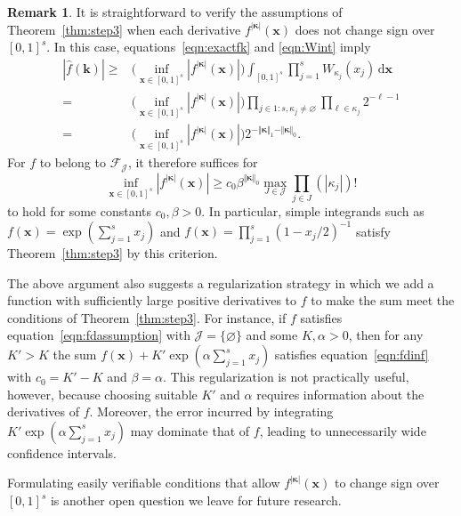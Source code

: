 \documentclass{article}
\theoremstyle{definition}
\newtheorem{remark}{Remark}
\renewcommand{\geq}{\geqslant}
\renewcommand{\emptyset}{\varnothing}
\newcommand{\cj}{\mathcal{J}}
\newcommand{\bsk}{\boldsymbol{k}}
\newcommand{\bsx}{\boldsymbol{x}}
\newcommand{\bskappa}{\boldsymbol{\kappa}}
\newcommand{\rd}{\,\mathrm{d}}
\begin{document}
\begin{remark}
    It is straightforward to verify the assumptions of Theorem~\ref{thm:step3} when each derivative $f^{|\bskappa|}(\bsx)$ does not change sign over $[0,1]^s$. In this case, equations~\eqref{eqn:exactfk} and \eqref{eqn:Wint} imply
    \begin{align*}
       |\hat{f}(\bsk)|\geq &\Big(\inf_{\bsx\in[0,1]^s}|f^{|\bskappa|}(\bsx)|\Big)\int_{[0,1]^s}\prod_{j=1}^s W_{\kappa_j}(x_j)\rd\bsx \\
       =& \Big(\inf_{\bsx\in[0,1]^s}|f^{|\bskappa|}(\bsx)|\Big) \prod_{j\in 1{:}s,\kappa_j\neq\emptyset} \prod_{\ell\in\kappa_j} 2^{-\ell-1} \\
       = & \Big(\inf_{\bsx\in[0,1]^s}|f^{|\bskappa|}(\bsx)|\Big) 2^{-\Vert \bskappa \Vert_1-\Vert \bskappa \Vert_0}.
    \end{align*}
    For $f$ to belong to $\mathcal{F}_{\cj}$, it therefore suffices for
   \begin{equation}\label{eqn:fdinf}
       \inf_{\bsx\in[0,1]^s}|f^{|\bskappa|}(\bsx)|\geq c_0 \beta^{\Vert\bskappa\Vert_0}\max_{J\in \cj}\prod_{j\in J} (|\kappa_j|)!
   \end{equation}
   to hold for some constants $c_0,\beta>0$. In particular, simple integrands such as  $f(\bsx)=\exp(\sum_{j=1}^s x_j)$ and $f(\bsx)=\prod_{j=1}^s (1-x_j/2)^{-1}$ satisfy Theorem~\ref{thm:step3} by this criterion.

The above argument also suggests a regularization strategy in which we add a function with sufficiently large positive derivatives to $f$ to make the sum meet the conditions of Theorem~\ref{thm:step3}. For instance, if  $f$ satisfies equation~\eqref{eqn:fdassumption} with $\cj=\{\emptyset\}$ and some $K,\alpha>0$, then for any $K'>K$ the sum $f(\bsx)+K' \exp(\alpha\sum_{j=1}^s x_j)$ satisfies equation~\eqref{eqn:fdinf} with $c_0=K'-K$ and $\beta=\alpha$. This regularization is not practically useful, however, because choosing suitable $K'$ and $\alpha$ requires information about the derivatives of $f$. Moreover, the error incurred by integrating $K' \exp(\alpha\sum_{j=1}^s x_j)$ may dominate that of $f$,  leading to unnecessarily wide confidence intervals.

Formulating easily verifiable conditions that allow $f^{|\bskappa|}(\bsx)$ to change sign over $[0,1]^s$ is another open question we leave for future research.
\end{remark}
\end{document}
